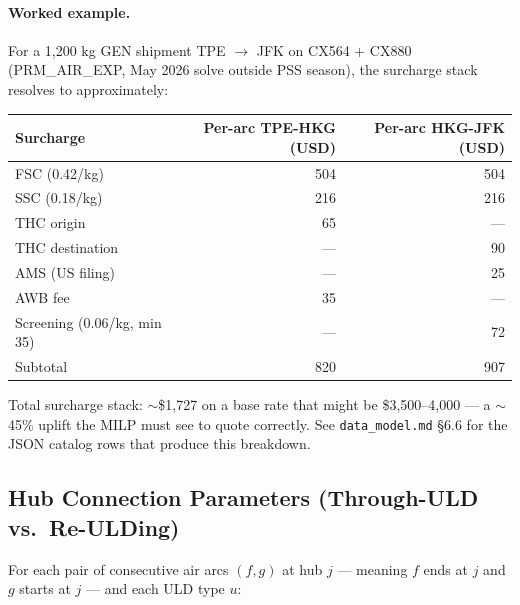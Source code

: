 \documentclass[11pt,a4paper]{article}
\theoremstyle{definition}
\begin{document}
\paragraph{Worked example.}
For a 1{,}200 kg GEN shipment TPE $\to$ JFK on CX564 + CX880 (PRM\_AIR\_EXP, May 2026
solve outside PSS season), the surcharge stack resolves to approximately:
\begin{center}
\begin{tabular}{lrr}
\toprule
Surcharge & Per-arc TPE-HKG (USD) & Per-arc HKG-JFK (USD) \\
\midrule
FSC (0.42/kg) & 504 & 504 \\
SSC (0.18/kg) & 216 & 216 \\
THC origin & 65 & --- \\
THC destination & --- & 90 \\
AMS (US filing) & --- & 25 \\
AWB fee & 35 & --- \\
Screening (0.06/kg, min 35) & --- & 72 \\
\midrule
Subtotal & 820 & 907 \\
\bottomrule
\end{tabular}
\end{center}
Total surcharge stack: $\sim$\$1{,}727 on a base rate that might be \$3{,}500--4{,}000
--- a $\sim$45\% uplift the MILP must see to quote correctly.
See \texttt{data\_model.md} \S6.6 for the JSON catalog rows that produce this
breakdown.

\subsection{Hub Connection Parameters (Through-ULD vs.\ Re-ULDing)}
\label{sec:through-uld}

For each pair of consecutive air arcs $(f, g)$ at hub $j$ — meaning $f$ ends at $j$ and $g$
starts at $j$ — and each ULD type $u$:
\end{document}
